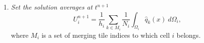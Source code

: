 \begin{enumerate}[label=Step \arabic*:]
\item \textit{Set the solution averages at $t^{n+1}$}
	\begin{equation}\label{eq:final_update}
	U^{n+1}_i =  \frac{1}{h_i}\sum_{k \in M_{i}}\frac{1}{N_i}\int_{\Omega_i} \hat q_k(x)~d\Omega_i,
	\end{equation}
	where $M_i$ is a set of merging tile indices to which cell $i$ belongs.
\end{enumerate}




	